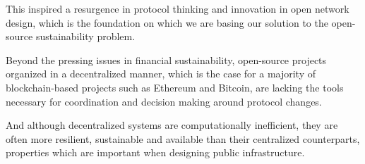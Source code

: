 This inspired a resurgence in protocol thinking and innovation in open network
design, which is the foundation on which we are basing our solution to the
open-source sustainability problem.

Beyond the pressing issues in financial sustainability, open-source projects
organized in a decentralized manner, which is the case for a majority of
blockchain-based projects such as Ethereum and Bitcoin, are lacking the tools
necessary for coordination and decision making around protocol changes.

And although decentralized systems are computationally inefficient, they are
often more resilient, sustainable and available than their centralized
counterparts, properties which are important when designing public
infrastructure.

